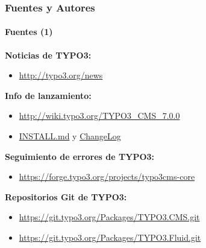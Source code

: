 \begin{frame}[fragile]
	\frametitle{Fuentes y Autores}
	\framesubtitle{Fuentes (1)}

	\textbf{Noticias de TYPO3:}
		\begin{itemize}\smaller
			\item \url{http://typo3.org/news}
		\end{itemize}

	\textbf{Info de lanzamiento:}
		\begin{itemize}\smaller
			\item \url{http://wiki.typo3.org/TYPO3_CMS_7.0.0}
			\item \href{https://github.com/TYPO3/TYPO3.CMS/blob/master/INSTALL.md}{INSTALL.md} y \href{https://github.com/TYPO3/TYPO3.CMS/blob/master/ChangeLog}{ChangeLog}
		\end{itemize}

	\textbf{Seguimiento de errores de TYPO3:}
		\begin{itemize}\smaller
			\item \url{https://forge.typo3.org/projects/typo3cms-core}
		\end{itemize}

	\textbf{Repositorios Git de TYPO3:}
		\begin{itemize}\smaller
			\item \url{https://git.typo3.org/Packages/TYPO3.CMS.git}
			\item \url{https://git.typo3.org/Packages/TYPO3.Fluid.git}
		\end{itemize}

\end{frame}


